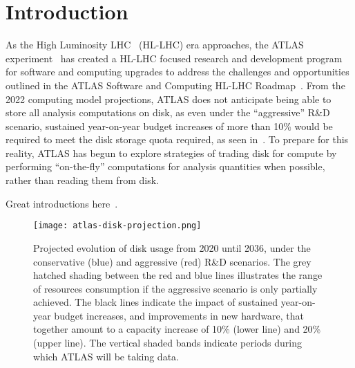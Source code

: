 \section{Introduction}\label{sec:introduction}

As the High Luminosity LHC~\cite{ZurbanoFernandez:2020cco} (HL-LHC) era approaches, the ATLAS experiment~\cite{PERF-2007-01} has created a HL-LHC focused research and development program~\cite{ATLAS:2020pnm} for software and computing upgrades to address the challenges and opportunities outlined in the ATLAS Software and Computing HL-LHC Roadmap~\cite{CERN-LHCC-2022-005}.
From the 2022 computing model projections, ATLAS does not anticipate being able to store all analysis computations on disk, as even under the ``aggressive'' R\&D scenario, sustained year-on-year budget increases of more than 10\% would be required to meet the disk storage quota required, as seen in~.
To prepare for this reality, ATLAS has begun to explore strategies of trading disk for compute by performing ``on-the-fly'' computations for analysis quantities when possible, rather than reading them from disk.

Great introductions here~\cite{nanobind}.

\begin{figure}
    \centering
    \texttt{[image: atlas-disk-projection.png]}
    \caption{Projected evolution of disk usage from 2020 until 2036, under the conservative (blue) and aggressive (red) R\&D scenarios.
The grey hatched shading between the red and blue lines illustrates the range of resources consumption if the aggressive scenario is only partially achieved.
The black lines indicate the impact of sustained year-on-year budget increases, and improvements in new hardware, that together amount to a capacity increase of 10\% (lower line) and 20\% (upper line).
The vertical shaded bands indicate periods during which ATLAS will be taking data.~\cite{CERN-LHCC-2022-005}}
    \label{fig:atlas-disk-projection}
\end{figure}
